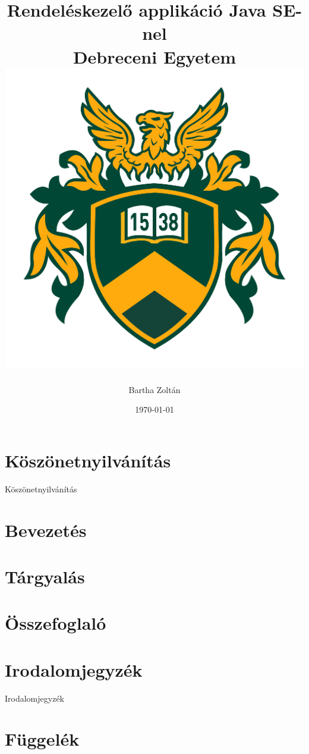 \documentclass[12pt]{report}
\title{
	{Rendeléskezelő applikáció Java SE-nel} \\
	{\large Debreceni Egyetem} \\
	{\includegraphics{ud-logo.png}}
}
\author{Bartha Zoltán}
\date{\today}
\begin{document}
	\maketitle
	
	\chapter*{Köszönetnyilvánítás}
	Köszönetnyilvánítás
	
	\tableofcontents
	
	\chapter{Bevezetés}
	
	
	
	\chapter{Tárgyalás}

	
	
	\chapter{Összefoglaló}

	
	
	\chapter{Irodalomjegyzék}

	Irodalomjegyzék
	
	\chapter{Függelék}
	
	
	
\end{document}
